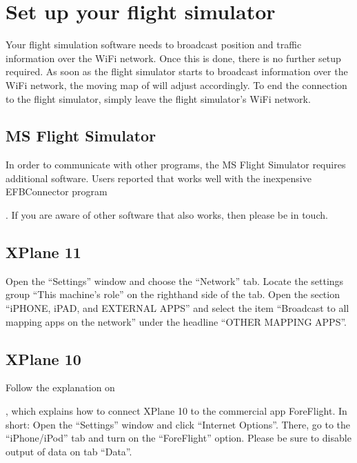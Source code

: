 \documentclass[letterpaper,10pt,english]{sphinxmanual}
\begin{document}
\section{Set up your flight simulator}
\label{\detokenize{02-steps/simulator:set-up-your-flight-simulator}}
\sphinxAtStartPar
Your flight simulation software needs to broadcast position and traffic
information over the Wi\sphinxhyphen{}Fi network.  Once this is done, there is no further
setup required.  As soon as the flight simulator starts to broadcast information
over the Wi\sphinxhyphen{}Fi network, the moving map of  will
adjust accordingly.  To end the connection to the flight simulator, simply leave
the flight simulator’s Wi\sphinxhyphen{}Fi network.


\subsection{MS Flight Simulator}
\label{\detokenize{02-steps/simulator:ms-flight-simulator}}
\sphinxAtStartPar
In order to communicate with other programs, the MS Flight Simulator requires
additional software. Users reported that  works
well with the inexpensive EFB\sphinxhyphen{}Connector program %
\begin{footnote}[18]\sphinxAtStartFootnote
{}
%
\end{footnote}.
If you are aware of other software that also works, then please be in touch.


\subsection{X\sphinxhyphen{}Plane 11}
\label{\detokenize{02-steps/simulator:id1}}
\sphinxAtStartPar
Open the “Settings” window and choose the “Network” tab.  Locate the settings
group “This machine’s role” on the right\sphinxhyphen{}hand side of the tab. Open the section
“iPHONE, iPAD, and EXTERNAL APPS” and select the item “Broadcast to all mapping
apps on the network” under the headline “OTHER MAPPING APPS”.

\noindent{}


\subsection{X\sphinxhyphen{}Plane 10}
\label{\detokenize{02-steps/simulator:id2}}
\sphinxAtStartPar
Follow the explanation on %
\begin{footnote}[19]\sphinxAtStartFootnote
{}
%
\end{footnote},
which explains how to connect X\sphinxhyphen{}Plane 10 to the commercial app ForeFlight.  In
short: Open the “Settings” window and click “Internet Options”. There, go to the
“iPhone/iPod” tab and turn on the “ForeFlight” option.  Please be sure to
disable output of data on tab “Data”.
\end{document}
